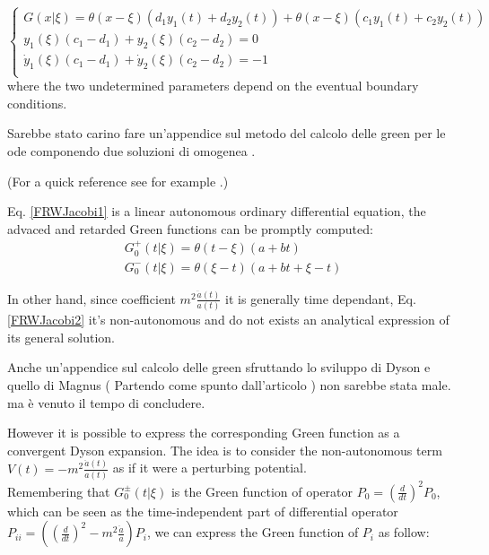 \documentclass[Main]{subfiles}
\begin{document}
			\begin{equation}
			\begin{cases}
                        G( x \vert \xi) = \theta( x - \xi) \left(d_1 y_1(t) + d_2 y_2(t) \right) + \theta( x - \xi) \left(c_1 y_1(t) + c_2 y_2(t) \right) \\
						y_1(\xi) (c_1-d_1) + y_2(\xi) ( c_2 - d_2) = 0 \\
						\dot{y}_1(\xi) (c_1-d_1) + \dot{y}_2(\xi) ( c_2 - d_2) = -1 \\
            \end{cases}
			\end{equation}
			where the two undetermined parameters depend on the eventual boundary conditions.
\ifToninus
	\begin{Warning}
		Sarebbe stato carino fare un'appendice sul metodo del calcolo delle green per le ode componendo due soluzioni di omogenea \cite{Tornberg}.
	\end{Warning}
\fi		
			(For a quick reference see for example \cite{Tornberg}.)
			
			 Eq. \ref{FRWJacobi1} is a linear autonomous ordinary differential equation, the advaced and retarded Green functions can be promptly computed:
			\begin{eqnarray*}
				G^+_0(t \vert \xi) = \theta(t-\xi) \left(a +b t \right) \\
				G^-_0( t \vert \xi) = \theta(\xi -t) \left( a +b t + \xi -t\right)
			\end{eqnarray*}

			In other hand, since coefficient $m^2 \frac{\ddot{a}(t)}{a(t)}$ it is generally time dependant,  Eq. \ref{FRWJacobi2} it's non-autonomous and do not exists an analytical expression of its general solution.
\ifToninus
	\begin{Warning}	
		Anche un'appendice sul calcolo delle green sfruttando lo sviluppo di Dyson e quello di Magnus ( Partendo come spunto dall'articolo \cite{Dappiaggi2014}) non sarebbe stata male. ma è venuto il tempo di concludere.
	\end{Warning}
\fi	
			However it is possible to express the corresponding Green function as a convergent Dyson expansion\cite{Dappiaggi2014}.
			The idea is to consider the non-autonomous term $V(t) = -m^2 \frac{\ddot{a}(t)}{a(t)}$ as if it were a perturbing potential.\\
			Remembering that $G^\pm_0 (t \vert \xi)$ is the Green function of operator \ifToninus$P_{0}=\left(\frac{d}{dt}\right)^2$\else$P_0$\fi, which can be seen as the time-independent part of differential operator \ifToninus$P_{i i}=\left( \left(\frac{d}{dt}\right)^2 - m^2 \frac{\ddot{a}}{a} \right)$\else$P_i$\fi, we can express the Green function of $P_{i}$ as follow:
			
\end{document}
